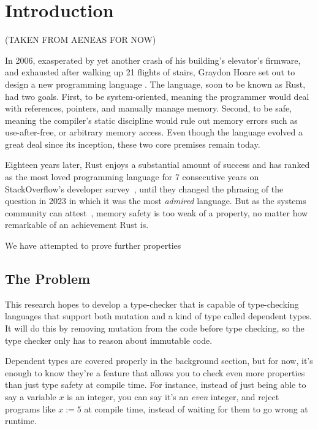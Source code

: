 \documentclass[12pt,twoside]{report}
\begin{document}
\chapter{Introduction}
(TAKEN FROM AENEAS FOR NOW)

In 2006, exasperated by yet another crash of his building's elevator's firmware, and exhausted after walking up 21 flights of stairs, Graydon Hoare set out to design a new programming language \citep{rust-anecdote}. The language, soon to be known as Rust, had two goals. First, to be system-oriented, meaning the programmer would deal with references, pointers, and manually manage memory. Second, to be safe, meaning the compiler's static discipline would rule out memory errors such as use-after-free, or arbitrary memory access. Even though the language evolved a great deal since its inception, these two core premises remain today. 

Eighteen years later, Rust enjoys a substantial amount of success and has ranked as the most loved programming language for 7 consecutive years on StackOverflow's developer survey~\citep{stackoverflow}, until they changed the phrasing of the question in 2023 in which it was the most \textit{admired} language. But as the systems community can attest~\citep{klein2009sel4,lorch2020armada,ferraiuolo2017komodo,bhargavan2017everest}, memory safety is too weak of a property, no matter how remarkable of an achievement Rust is.

We have attempted to prove further properties 

\section{The Problem}
This research hopes to develop a type-checker that is capable of type-checking languages that support both mutation and a kind of type called dependent types. It will do this by removing mutation from the code before type checking, so the type checker only has to reason about immutable code.

Dependent types are covered properly in the background section, but for now, it's enough to know they're a feature that allows you to check even more properties than just type safety at compile time. For instance, instead of just being able to say a variable $x$ is an integer, you can say it's an \textit{even} integer, and reject programs like $x := 5$ at compile time, instead of waiting for them to go wrong at runtime.
\end{document}
